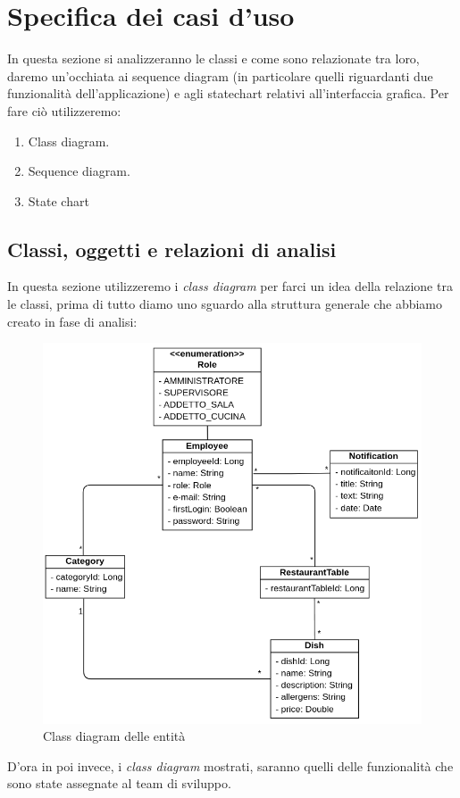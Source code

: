 \section{Specifica dei casi d'uso}
In questa sezione si analizzeranno le classi e come sono relazionate tra loro, daremo un'occhiata ai sequence diagram (in particolare quelli riguardanti due funzionalità dell'applicazione) e agli statechart relativi all'interfaccia grafica. Per fare ciò utilizzeremo:
\begin{enumerate}
  \item Class diagram.
  \item Sequence diagram.
  \item State chart
\end{enumerate}
\subsection{Classi, oggetti e relazioni di analisi}
In questa sezione utilizzeremo i \textit{class diagram} per farci un idea della relazione tra le classi, prima di tutto diamo uno sguardo alla struttura generale che abbiamo creato in fase di analisi:
\begin{figure}[H]
  \centering
  \includegraphics[scale=0.6]{img/class_diagrams/generalClassDiagram.png}
  \caption{Class diagram delle entità}
\end{figure}
D'ora in poi invece, i \textit{class diagram} mostrati, saranno quelli delle funzionalità che sono state assegnate al team di sviluppo.
\newpage
